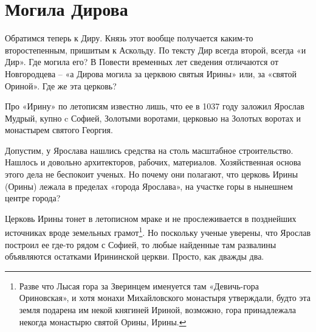 \chapter{Могила Дирова}




Обратимся теперь к Диру. Князь этот вообще получается каким-то второстепенным, пришитым к Аскольду. По тексту Дир всегда второй, всегда «и Дир». Где могила его? В Повести временных лет сведения отличаются от Новгородцева – «а Дирова могила за церквою святыя Ирины» или, за «святой Ориной». Где же эта церковь? 

Про «Ирину» по летописям известно лишь, что ее в 1037 году заложил Ярослав Мудрый, купно c Софией, Золотыми воротами, церковью на Золотых воротах и монастырем святого Георгия. 

Допустим, у Ярослава нашлись средства на столь масштабное строительство. Нашлось и довольно архитекторов, рабочих, материалов. Хозяйственная основа этого дела не беспокоит ученых. Но почему они полагают, что церковь Ирины (Орины) лежала в пределах «города Ярослава», на участке горы в нынешнем центре города?

Церковь Ирины тонет в летописном мраке и не прослеживается в позднейших источниках вроде земельных грамот\footnote{Разве что Лысая гора за Зверинцем именуется там «Девичь-гора Ориновская», и хотя монахи Михайловского монастыря утверждали, будто эта земля подарена им некой княгиней Ириной, возможно, гора принадлежала некогда монастырю святой Орины, Ирины.}. Но поскольку ученые уверены, что Ярослав построил ее где-то рядом с Софией, то любые найденные там развалины объявляются остатками Ирининской церкви. Просто, как дважды два.


